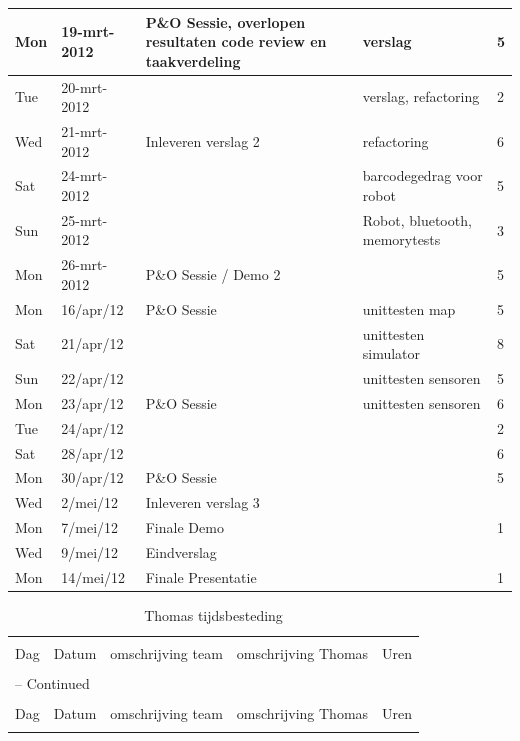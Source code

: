 \documentclass[12pt,a4paper]{report}
\begin{document}
\begin{landscape}
\begin{longtable}{llp{7cm}p{10cm}l}
\hline
Mon & 19-mrt-2012 & P\&O Sessie, overlopen resultaten code review en taakverdeling & verslag & 5 \\ 
\hline
Tue & 20-mrt-2012 &  & verslag, refactoring & 2 \\ 
\hline
Wed & 21-mrt-2012 & Inleveren verslag 2 & refactoring & 6 \\ 
\hline
Sat & 24-mrt-2012 &  & barcodegedrag voor robot & 5 \\ 
\hline
Sun & 25-mrt-2012 &  & Robot, bluetooth, memorytests & 3 \\ 
\hline
Mon & 26-mrt-2012 & P\&O Sessie / Demo 2 &  & 5 \\ 
\hline
Mon & 16/apr/12 & P\&O Sessie & unittesten map & 5 \\ 
\hline
Sat & 21/apr/12 &  & unittesten simulator & 8 \\ 
\hline
Sun & 22/apr/12 &  & unittesten sensoren & 5 \\ 
\hline
Mon & 23/apr/12 & P\&O Sessie & unittesten sensoren & 6 \\ 
\hline
Tue & 24/apr/12 &  &  & 2 \\ 
\hline
Sat & 28/apr/12 &  &  & 6 \\ 
\hline
Mon & 30/apr/12 & P\&O Sessie &  & 5 \\ 
\hline
Wed & 2/mei/12 & Inleveren verslag 3 &  &  \\ 
\hline
Mon & 7/mei/12 & Finale Demo &  & 1 \\ 
\hline
Wed & 9/mei/12 & Eindverslag &  &  \\ 
\hline
Mon & 14/mei/12 & Finale Presentatie &  & 1 \\ 
\hline

\end{longtable}
\normalsize

\begin{longtable}{llp{7cm}p{10cm}l}
\caption{Thomas tijdsbesteding} \\

\hline \hline \\[-2ex]
  \multicolumn{1}{l}{Dag} & \multicolumn{1}{l}{Datum} &
  \multicolumn{1}{p{7cm}}{omschrijving team} &
  \multicolumn{1}{p{10cm}}{omschrijving Thomas} &
  \multicolumn{1}{l}{Uren}  \\[0.5ex] \hline \\[-1.8ex]
\endfirsthead

\multicolumn{5}{l}{{\tablename} \thetable{} -- Continued} \\[0.5ex]
\hline \hline \\[-2ex]
  \multicolumn{1}{l}{Dag} & \multicolumn{1}{l}{Datum} &
  \multicolumn{1}{p{7cm}}{omschrijving team} &
  \multicolumn{1}{p{10cm}}{omschrijving Thomas} &
  \multicolumn{1}{l}{Uren}  \\[0.5ex] \hline \\[-1.8ex]
\endhead


\end{longtable}
\end{landscape}
\end{document}
